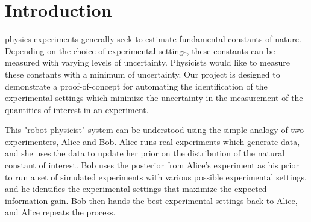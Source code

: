 \documentclass[10pt,journal,compsoc]{IEEEtran}
\begin{document}
\ifCLASSOPTIONcompsoc
{}
\else
\section{Introduction}
\label{sec:introduction}
\fi




% 
% 
% 
% 
 physics experiments generally seek to estimate fundamental constants of nature. Depending on the choice of experimental settings, these constants can be measured with varying levels of uncertainty. Physicists would like to measure these constants with a minimum of uncertainty. Our project is designed to demonstrate a proof-of-concept for automating the identification of the experimental settings which minimize the uncertainty in the measurement of the quantities of interest in an experiment.

This "robot physicist" system can be understood using the simple analogy of two experimenters, Alice and Bob. Alice runs real experiments which generate data, and she uses the data to update her prior on the distribution of the natural constant of interest. Bob uses the posterior from Alice's experiment as his prior to run a set of simulated experiments with various possible experimental settings, and he identifies the experimental settings that maximize the expected information gain. Bob then hands the best experimental settings back to Alice, and Alice repeats the process.
\end{document}

